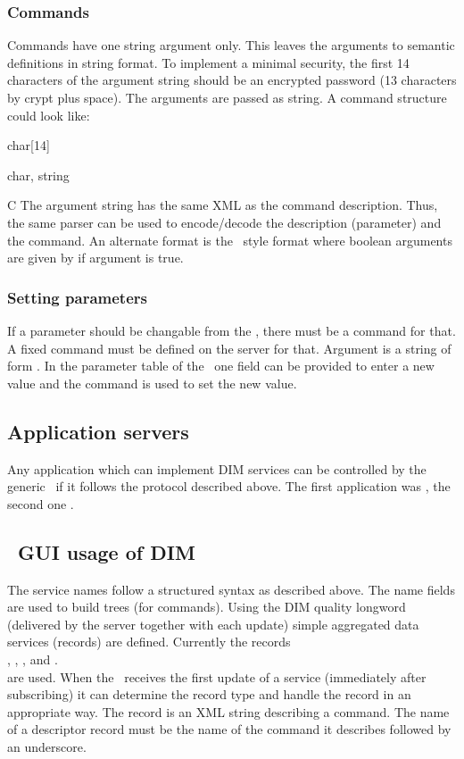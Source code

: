 \subsubsection{Commands}
Commands have one string argument only. This leaves the arguments to semantic definitions in string format. To implement a minimal security, the first 14 characters of the argument string should be an encrypted password (13 characters by crypt plus space). The arguments are passed as string. A command structure could look like:
\bdes
\item[password]   char[14]
\item[argument]   char,  string
\item[Format:] C
\edes
The argument string has the same XML as the command description. Thus, the same parser can be used to encode/decode the description (parameter) and the command. An alternate format is the \mbs\ style format  where boolean arguments are given by  if argument is true.
\subsubsection{Setting parameters}
If a parameter should be changable from the \gui, there must be a command for that. A fixed command  must be defined on the server for that. 
Argument is a string of form . In the parameter table of the \gui\ one field can be provided to enter a new value and the command  is used to set the new value.
\subsection{Application servers}
Any application which can implement DIM services can be controlled by the generic \gui\ if it follows the protocol described above. The first application was \dabc, the second one \mbs.
\subsection[DABC GUI usage of DIM]{\dabc\ GUI usage of DIM}
The service names follow a structured syntax as described above. The name fields are used to
build trees (for commands). Using the DIM quality longword (delivered by the server together
with each update) simple aggregated data services (records) are defined.
Currently the records \\
, , ,  and .\\
are used. When the \gui\ receives the first update of a service (immediately after subscribing)
it can determine the record type and handle the record in an appropriate way.
The  record is an XML string describing a command.
The name of a descriptor record must be the name of the command it describes followed by an underscore.
